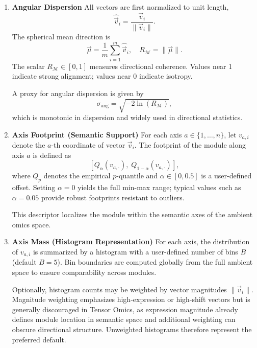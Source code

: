 \begin{enumerate}
            \item \textbf{Angular Dispersion}  
                All vectors are first normalized to unit length,
                \[
                    \hat{\vec{v}}_i = \frac{\vec{v}_i}{\|\vec{v}_i\|}.
                \]
                The spherical mean direction is
                \[
                    \vec{\mu} =
                    \frac{1}{m} \sum_{i=1}^{m} \hat{\vec{v}}_i,
                    \quad
                    R_{\mathcal{M}} = \|\vec{\mu}\|.
                \]
                The scalar \(R_{\mathcal{M}} \in [0,1]\) measures directional coherence.
                Values near 1 indicate strong alignment; values near 0 indicate isotropy.

                A proxy for angular dispersion is given by
                \[
                    \sigma_{\mathrm{ang}} = \sqrt{-2 \ln(R_{\mathcal{M}})},
                \]
                which is monotonic in dispersion and widely used in directional statistics.

            \item \textbf{Axis Footprint (Semantic Support)}  
                  For each axis \(a \in \{1,\ldots,n\}\), let \(v_{a,i}\) denote the \(a\)-th
                  coordinate of vector \(\vec{v}_i\).
                  The footprint of the module along axis \(a\) is defined as
                  \[
                      \left[
                      Q_{\alpha}(v_{a,\cdot}),
                      \;
                      Q_{1-\alpha}(v_{a,\cdot})
                      \right],
                  \]
                  where \(Q_p\) denotes the empirical \(p\)-quantile and
                  \(\alpha \in [0,0.5]\) is a user-defined offset.
                  Setting \(\alpha = 0\) yields the full min-max range; typical values such as
                  \(\alpha = 0.05\) provide robust footprints resistant to outliers.

                  This descriptor localizes the module within the semantic axes of the ambient
                  omics space.

            \item \textbf{Axis Mass (Histogram Representation)}  
                  For each axis, the distribution of \(v_{a,i}\) is summarized by a histogram with
                  a user-defined number of bins \(B\) (default \(B=5\)).
                  Bin boundaries are computed globally from the full ambient space to ensure
                  comparability across modules.

                  Optionally, histogram counts may be weighted by vector magnitudes
                  \( \|\vec{v}_i\| \).
                  Magnitude weighting emphasizes high-expression or high-shift vectors but is
                  generally discouraged in Tensor Omics, as expression magnitude already defines
                  module location in semantic space and additional weighting can obscure
                  directional structure.
                  Unweighted histograms therefore represent the preferred default.

        \end{enumerate}

